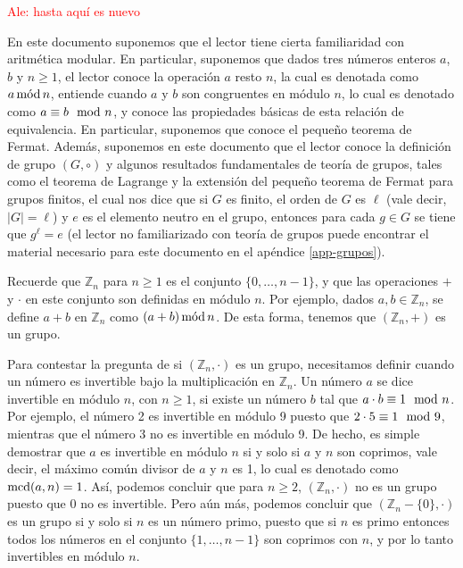 


\textcolor{red}{Ale: hasta aquí es nuevo}

En este documento suponemos que el lector tiene cierta familiaridad
con aritmética modular. En particular, suponemos que dados tres
números enteros $a$, $b$ y $n \geq 1$, el lector conoce la operación
$a$ resto $n$, la cual es denotada como $a \mods n$, entiende cuando
$a$ y $b$ son congruentes en módulo $n$, lo cual es denotado como $a
\equiv b \modl n$, y conoce las propiedades básicas de esta relación
de equivalencia. En particular, suponemos que conoce el pequeño
teorema de Fermat. Además, suponemos en este documento que el lector
conoce la definición de grupo $(G, \circ)$ y algunos resultados
fundamentales de teoría de grupos, tales como el teorema de Lagrange y
la extensión del pequeño teorema de Fermat para grupos finitos, el
cual nos dice que si $G$ es finito, el orden de $G$ es $\ell$ (vale
decir, $|G| = \ell$) y $e$ es el elemento neutro en el grupo, entonces
para cada $g \in G$ se tiene que $g^\ell = e$ (el lector no
familiarizado con teoría de grupos puede encontrar el material
necesario para este documento en el apéndice \ref{app-grupos}).

Recuerde que $\mathbb{Z}_n$ para $n \geq 1$ es el conjunto $\{0,
\ldots, n-1\}$, y que las operaciones $+$ y $\cdot$ en este conjunto
son definidas en módulo $n$. Por ejemplo, dados $a,b \in
\mathbb{Z}_n$, se define $a + b$ en $\mathbb{Z}_n$ como $(a + b) \mods
n$. De esta forma, tenemos que $(\mathbb{Z}_n, +)$ es un grupo.

Para contestar la pregunta de si $(\mathbb{Z}_n, \cdot)$ es un grupo,
necesitamos definir cuando un número es invertible bajo la
multiplicación en $\mathbb{Z}_n$.  Un número $a$ se dice invertible en
módulo $n$, con $n \geq 1$, si existe un número $b$ tal que $a \cdot b
\equiv 1 \modl n$. Por ejemplo, el número 2 es invertible en módulo 9
puesto que $2 \cdot 5 \equiv 1 \modl 9$, mientras que el número 3 no
es invertible en módulo 9. De hecho, es simple demostrar que $a$ es
invertible en módulo $n$ si y solo si $a$ y $n$ son coprimos, vale
decir, el máximo común divisor de $a$ y $n$ es 1, lo cual es denotado
como $\MCD(a,n) = 1$.  Así, podemos concluir que para $n \geq 2$,
$(\mathbb{Z}_n, \cdot)$ no es un grupo puesto que $0$ no es
invertible. Pero aún más, podemos concluir que $(\mathbb{Z}_n - \{0\},
\cdot)$ es un grupo si y solo si $n$ es un número primo, puesto que si
$n$ es primo entonces todos los números en el conjunto $\{1, \ldots,
n-1\}$ son coprimos con $n$, y por lo tanto invertibles en módulo $n$.

